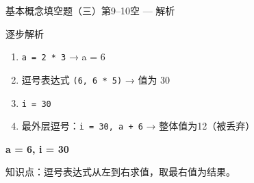\begin{frame}{基本概念填空题（三）}{第9--10空 --- 解析}
    \begin{alertblock}{逐步解析}
        \footnotesize
        \begin{enumerate}
            \setlength{\itemsep}{0pt}
            \item \texttt{a = 2 * 3} → a = 6
            \item 逗号表达式 \texttt{(6, 6 * 5)} → 值为 30
            \item \texttt{i = 30}
            \item 最外层逗号：\texttt{i = 30, a + 6} → 整体值为12（被丢弃）
        \end{enumerate}
        \textbf{a = 6, i = 30}

        \vspace{0.3em}
        {\color{highlight}知识点：逗号表达式从左到右求值，取最右值为结果。}
    \end{alertblock}
\end{frame}

